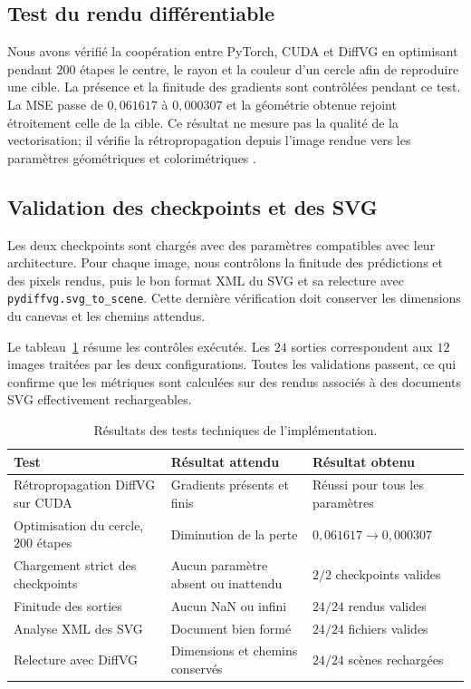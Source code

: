 \documentclass[12pt, a4paper, oneside]{report}
\begin{document}
\subsection{Test du rendu différentiable}

Nous avons vérifié la coopération entre PyTorch, CUDA et DiffVG en optimisant pendant $200$ étapes le centre, le rayon et la couleur d'un cercle afin de reproduire une cible. La présence et la finitude des gradients sont contrôlées pendant ce test. La MSE passe de $0{,}061617$ à $0{,}000307$ et la géométrie obtenue rejoint étroitement celle de la cible. Ce résultat ne mesure pas la qualité de la vectorisation; il vérifie la rétropropagation depuis l'image rendue vers les paramètres géométriques et colorimétriques \cite{li2020diffvg}.

\subsection{Validation des checkpoints et des SVG}

Les deux checkpoints sont chargés avec des paramètres compatibles avec leur architecture. Pour chaque image, nous contrôlons la finitude des prédictions et des pixels rendus, puis le bon format XML du SVG et sa relecture avec \texttt{pydiffvg.svg\_to\_scene}. Cette dernière vérification doit conserver les dimensions du canevas et les chemins attendus.

Le tableau~\ref{tab:validation_implementation} résume les contrôles exécutés. Les $24$ sorties correspondent aux $12$ images traitées par les deux configurations. Toutes les validations passent, ce qui confirme que les métriques sont calculées sur des rendus associés à des documents SVG effectivement rechargeables.

\begin{table}[H]
    \centering
    \small
    \caption{Résultats des tests techniques de l'implémentation.}
    \label{tab:validation_implementation}
    \begin{tabular}{p{5.5cm}p{3.2cm}p{4.0cm}}
        \toprule
        \textbf{Test} & \textbf{Résultat attendu} & \textbf{Résultat obtenu} \\
        \midrule
        Rétropropagation DiffVG sur CUDA & Gradients présents et finis & Réussi pour tous les paramètres \\
        Optimisation du cercle, $200$ étapes & Diminution de la perte & $0{,}061617 \rightarrow 0{,}000307$ \\
        Chargement strict des checkpoints & Aucun paramètre absent ou inattendu & $2/2$ checkpoints valides \\
        Finitude des sorties & Aucun NaN ou infini & $24/24$ rendus valides \\
        Analyse XML des SVG & Document bien formé & $24/24$ fichiers valides \\
        Relecture avec DiffVG & Dimensions et chemins conservés & $24/24$ scènes rechargées \\
        \bottomrule
    \end{tabular}
\end{table}
\end{document}
